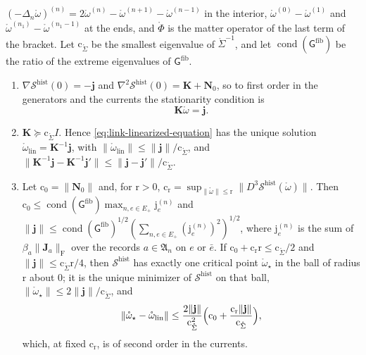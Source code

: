 $(-\Delta_n\mathring\omega)^{(n)}=2\mathring\omega^{(n)}-\mathring\omega^{(n+1)}-\mathring\omega^{(n-1)}$ in the
interior, $\mathring\omega^{(0)}-\mathring\omega^{(1)}$ and $\mathring\omega^{(n_1)}-\mathring\omega^{(n_1-1)}$ at
the ends, and $\mathring\Phi$ is the matter operator of the last term of the bracket. Let
$\mathrm c_{\mathring\Sigma}$ be the smallest eigenvalue of $\mathring\Sigma^{-1}$, and let
$\operatorname{cond}(\mathsf G^{\mathrm{fib}})$ be the ratio of the extreme eigenvalues of
$\mathsf G^{\mathrm{fib}}$.
\begin{enumerate}
\item[(a)] $\nabla\mathscr S^{\mathrm{hist}}(0)=-\mathbf j$ and $\nabla^2\mathscr S^{\mathrm{hist}}(0)=\mathbf K+\mathbf N_0$, so to first order in
the generators and the currents the stationarity condition is
\begin{equation}
\mathbf K\mathring\omega=\mathbf j.
\label{eq:link-linearized-equation}
\end{equation}
\item[(b)] $\mathbf K\succeq\mathrm c_{\mathring\Sigma}I$. Hence \eqref{eq:link-linearized-equation}
has the unique solution $\mathring\omega_{\mathrm{lin}}=\mathbf K^{-1}\mathbf j$, with
$\lVert\mathring\omega_{\mathrm{lin}}\rVert\leq\lVert\mathbf j\rVert/\mathrm c_{\mathring\Sigma}$, and
$\lVert\mathbf K^{-1}\mathbf j-\mathbf K^{-1}\mathbf j'\rVert\leq\lVert\mathbf j-\mathbf j'\rVert/\mathrm c_{\mathring\Sigma}$.
\item[(c)] Let $\mathrm c_0=\lVert\mathbf N_0\rVert$ and, for $\mathrm r>0$,
$\mathrm c_{\mathrm r}=\sup_{\lVert\mathring\omega\rVert\leq\mathrm r}\lVert D^3\mathscr S^{\mathrm{hist}}(\mathring\omega)\rVert$. Then
$\mathrm c_0\leq\operatorname{cond}(\mathsf G^{\mathrm{fib}})\max_{n,e\in E_+}\mathrm j^{(n)}_e$ and
$\lVert\mathbf j\rVert\leq\operatorname{cond}(\mathsf G^{\mathrm{fib}})^{1/2}(\sum_{n,e\in E_+}(\mathrm j^{(n)}_e)^2)^{1/2}$,
where $\mathrm j^{(n)}_e$ is the sum of $\beta_a\lVert\mathbf J_a\rVert_{\mathrm F}$ over the records
$a\in\mathfrak A_n$ on $e$ or $\bar e$. If $\mathrm c_0+\mathrm c_{\mathrm r}\mathrm r\leq\mathrm c_{\mathring\Sigma}/2$ and
$\lVert\mathbf j\rVert\leq\mathrm c_{\mathring\Sigma}\mathrm r/4$, then $\mathscr S^{\mathrm{hist}}$ has exactly one critical point
$\mathring\omega_\star$ in the ball of radius $\mathrm r$ about $0$; it is the unique minimizer of $\mathscr S^{\mathrm{hist}}$ on
that ball, $\lVert\mathring\omega_\star\rVert\leq2\lVert\mathbf j\rVert/\mathrm c_{\mathring\Sigma}$, and
\begin{equation}
\lVert\mathring\omega_\star-\mathring\omega_{\mathrm{lin}}\rVert
\leq\frac{2\lVert\mathbf j\rVert}{\mathrm c_{\mathring\Sigma}^2}\Bigl(\mathrm c_0+\frac{\mathrm c_{\mathrm r}\lVert\mathbf j\rVert}{\mathrm c_{\mathring\Sigma}}\Bigr),
\label{eq:link-linearization-error}
\end{equation}
which, at fixed $\mathrm c_{\mathrm r}$, is of second order in the currents.
\end{enumerate}

